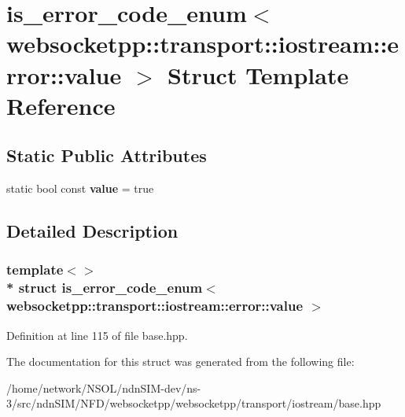 \hypertarget{structis__error__code__enum_3_01websocketpp_1_1transport_1_1iostream_1_1error_1_1value_01_4}{}\section{is\+\_\+error\+\_\+code\+\_\+enum$<$ websocketpp\+:\+:transport\+:\+:iostream\+:\+:error\+:\+:value $>$ Struct Template Reference}
\label{structis__error__code__enum_3_01websocketpp_1_1transport_1_1iostream_1_1error_1_1value_01_4}
\subsection*{Static Public Attributes}
\begin{DoxyCompactItemize}
\item 
static bool const {\bfseries value} = true\hypertarget{structis__error__code__enum_3_01websocketpp_1_1transport_1_1iostream_1_1error_1_1value_01_4_a8d3f807aad82dad37582b8331d2d077a}{}\label{structis__error__code__enum_3_01websocketpp_1_1transport_1_1iostream_1_1error_1_1value_01_4_a8d3f807aad82dad37582b8331d2d077a}

\end{DoxyCompactItemize}


\subsection{Detailed Description}
\subsubsection*{template$<$$>$\\*
struct is\+\_\+error\+\_\+code\+\_\+enum$<$ websocketpp\+::transport\+::iostream\+::error\+::value $>$}



Definition at line 115 of file base.\+hpp.



The documentation for this struct was generated from the following file\+:\begin{DoxyCompactItemize}
\item 
/home/network/\+N\+S\+O\+L/ndn\+S\+I\+M-\/dev/ns-\/3/src/ndn\+S\+I\+M/\+N\+F\+D/websocketpp/websocketpp/transport/iostream/base.\+hpp\end{DoxyCompactItemize}
